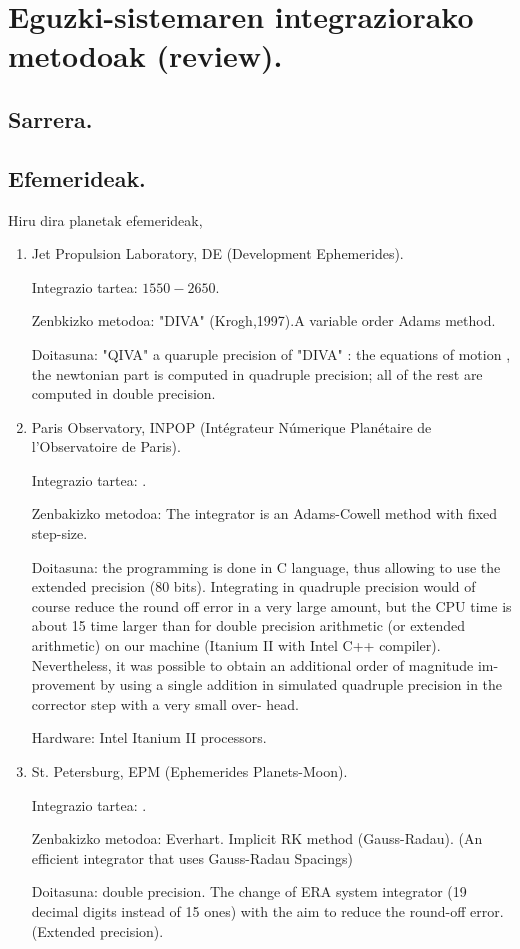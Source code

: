 \chapter{Eguzki-sistemaren integraziorako metodoak (review).}

\section{Sarrera.}

\section{Efemerideak.}

Hiru dira planetak efemerideak,

\begin{enumerate}
\item Jet Propulsion Laboratory, DE (Development Ephemerides).

      Integrazio tartea: $1550-2650$.

      Zenbkizko metodoa: "DIVA" (Krogh,1997).A variable order Adams method.
      
      Doitasuna: "QIVA" a quaruple precision of "DIVA" : the equations of motion , the newtonian part is computed in quadruple precision; all of the rest are computed in double precision.

\item Paris Observatory, INPOP (Intégrateur Númerique Planétaire de l'Observatoire de Paris).
      
      Integrazio tartea: .
      
	  Zenbakizko metodoa: The integrator is an Adams-Cowell method with fixed step-size.
	  
	  Doitasuna:  the programming is done in C language, thus allowing to use the extended precision (80 bits). 
	  Integrating in quadruple precision would of course reduce the round off error in a very large amount, but the
	  CPU time is about 15 time larger than for double precision arithmetic (or extended arithmetic) on our machine
	  (Itanium II with Intel C++ compiler). Nevertheless, it was possible to obtain an additional order of magnitude im-
	  provement by using a single addition in simulated quadruple precision in the corrector step with a very small over-
	  head.
	  
	  Hardware: Intel Itanium II processors.
	  
\item St. Petersburg, EPM (Ephemerides Planets-Moon).
      
      Integrazio tartea: .
      
      Zenbakizko metodoa: Everhart. Implicit RK method (Gauss-Radau).
      (An efficient integrator that uses Gauss-Radau Spacings)
      
      Doitasuna: double precision. The change of ERA system integrator (19 decimal digits instead of 15 ones) with the aim to reduce the round-off error. (Extended precision).
      
\end{enumerate}

